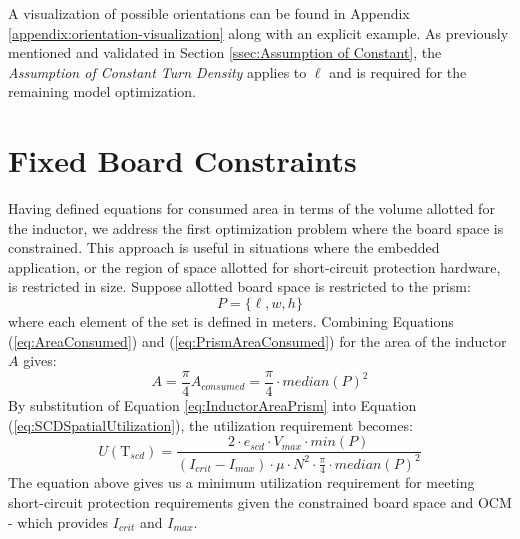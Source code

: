 \documentclass[11pt,oneside]{report}
\begin{document}
    A visualization of possible orientations can be found in Appendix \ref{appendix:orientation-visualization} along with an explicit example. As previously mentioned and validated in Section \ref{ssec:Assumption of Constant}, the \textit{Assumption of Constant Turn Density} applies to $\ell$ and is required for the remaining model optimization.

    
    \section{Fixed Board Constraints}
    
    Having defined equations for consumed area in terms of the volume allotted for the inductor, we address the first optimization problem where the board space is constrained. This approach is useful in situations where the embedded application, or the region of space allotted for short-circuit protection hardware, is restricted in size. Suppose allotted board space is restricted to the prism:
    \begin{equation}\label{eq:Prism2}
    P = \{\ell, w, h\} \nonumber
    \end{equation}
    where each element of the set is defined in meters. Combining Equations (\ref{eq:AreaConsumed}) and (\ref{eq:PrismAreaConsumed}) for the area of the inductor $A$ gives:
    \begin{equation}\label{eq:InductorAreaPrism}
    A = \frac{\pi}{4} A_{consumed} = \frac{\pi}{4} \cdot median(P)^2 \nonumber
    \end{equation}
    By substitution of Equation \ref{eq:InductorAreaPrism} into Equation (\ref{eq:SCDSpatialUtilization}), the utilization requirement becomes:
    \begin{equation}\label{eq:MinUtilizationPrism}
    U(\mathrm{T}_{scd}) = \frac{2 \cdot e_{scd} \cdot V_{max} \cdot min(P)}{(I_{crit}-I_{max}) \cdot \mu \cdot N^{2} \cdot \frac{\pi}{4} \cdot median(P)^2}
    \end{equation}
    The equation above gives us a minimum utilization requirement for meeting short-circuit protection requirements given the constrained board space and OCM - which provides $I_{crit}$ and $I_{max}$.
\end{document}
